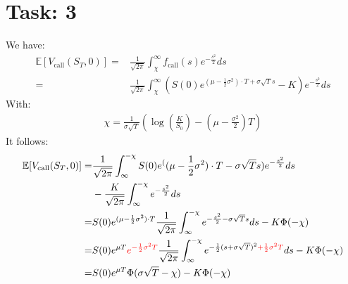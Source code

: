 \documentclass{article}
\begin{document}
\section*{Task: 3}

\noindent We have:
\begin{align*}
 \mathbb{E}[V_{\text{call}}(S_T,0)] =& \frac{1}{\sqrt{2 \pi}} \int_{\chi}^\infty f_{\text{call}}(s)e^{-\frac{s^2}{2}}ds\\
  =&\frac{1}{\sqrt{2 \pi}} \int_{\chi}^\infty \left( S(0)e^{(\mu-\frac{1}{2}\sigma^2)\cdot T+\sigma\sqrt{T}s}-K\right)e^{-\frac{s^2}{2}}ds
\end{align*}
With:
\begin{align*}
 \chi = \frac{1}{\sigma \sqrt{T}}\left(\log\left(\frac{K}{S_0}\right)-\left(\mu-\frac{\sigma^2}{2}\right)T\right)
\end{align*}
It follows:
\begin{align*}
 \mathbb{E}[V_{\text{call}}(S_T,0)] = & \frac{1}{\sqrt{2 \pi}} \int_{\infty}^{-\chi} S(0)e^((\mu-\frac{1}{2}\sigma^2)\cdot T-\sigma\sqrt{T}s)e^{-\frac{s^2}{2}}ds\\
                                      & - \frac{K}{\sqrt{2 \pi}} \int_{\infty}^{-\chi} e^{-\frac{s^2}{2}}ds\\
                                    = & S(0) e^{(\mu-\frac{1}{2}\sigma^2)\cdot T}\frac{1}{\sqrt{2 \pi}} \int_{\infty}^{-\chi} e^{-\frac{s^2}{2}-\sigma\sqrt{T}s}ds - K \Phi(-\chi)\\
                                    = & S(0) e^{\mu T}\textcolor{red}{e^{-\frac{1}{2}\sigma^2 T}}\frac{1}{\sqrt{2 \pi}} \int_{\infty}^{-\chi} e^{-\frac{1}{2}(s+\sigma\sqrt{T})^2\textcolor{red}{+\frac{1}{2}\sigma^2 T}}ds - K \Phi(-\chi)\\
                                    = & S(0) e^{\mu T} \Phi(\sigma \sqrt{T} - \chi) - K \Phi(-\chi)
\end{align*}
{\flushright{$\qed$}}
\end{document}
